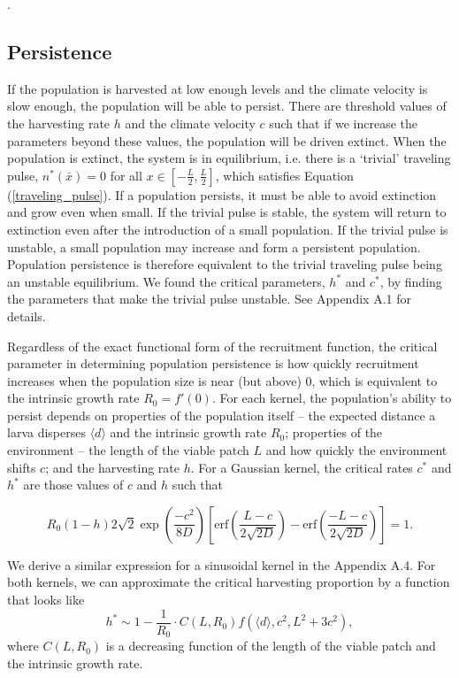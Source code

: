 \documentclass[12pt,english]{article}
\begin{document}
\begin{spacing}{1.9}
\begin{flushleft}
\noindent \citep{Latore:1998fk}.

\subsection{Persistence }
If the population is harvested at low enough levels and the climate velocity is slow enough, the population will be able to persist.  There are threshold values of the harvesting rate $h$ and the climate velocity $c$ such that if we increase the parameters beyond these values, the population will be driven extinct.  When the population is extinct, the system is in equilibrium, i.e. there is a `trivial' traveling pulse, $n^*(\bar{x}) = 0$ for all $x \in \left[-\frac{L}{2}, \frac{L}{2}\right]$, which satisfies Equation (\ref{traveling_pulse}).  If a population persists, it must be able to avoid extinction and grow even when small. If the trivial pulse is stable, the system will return to extinction even after the introduction of a small population. If the trivial pulse is unstable, a small population may increase and form a persistent population. Population persistence is therefore equivalent to the trivial traveling pulse being an unstable equilibrium.  We found the critical parameters, $h^*$ and  $c^*$, by finding the parameters that make the trivial pulse unstable.  See Appendix A.1 for details.

Regardless of the exact functional form of the recruitment function, the critical parameter in determining population persistence is how quickly recruitment increases when the population size is near (but above) $0$, which is equivalent to the intrinsic growth rate $R_0=f'(0)$.  For each kernel, the population's ability to persist depends on properties of the population itself -- the expected distance a larva disperses $\langle d \rangle$ and the intrinsic growth rate $R_0$; properties of the environment -- the length of the viable patch $L$ and how quickly the environment shifts $c$; and the harvesting rate $h$.  
For a Gaussian kernel, the critical rates $c^*$ and $h^*$ are those values of $c$ and $h$ such that 

\[R_0(1-h)2\sqrt{2}\exp\left(\frac{-c^2}{8D}\right)\left[\text{erf}\left(\frac{L-c}{2\sqrt{2D}}\right)-\text{erf}\left(\frac{-L-c}{2\sqrt{2D}}\right)\right]=1.\]

We derive a similar expression for a sinusoidal kernel in the Appendix A.4.  For both kernels, we can approximate the critical harvesting proportion by a function that looks like 
\begin{equation*}
h^*\sim1- \frac{1}{R_0}\cdot C(L,R_0)f(\langle d \rangle,c^2,L^2+3c^2),
\end{equation*}
where $C(L,R_0)$ is a decreasing function of the length of the viable patch and the intrinsic growth rate.
   


\end{flushleft}
\end{spacing}
\end{document}
